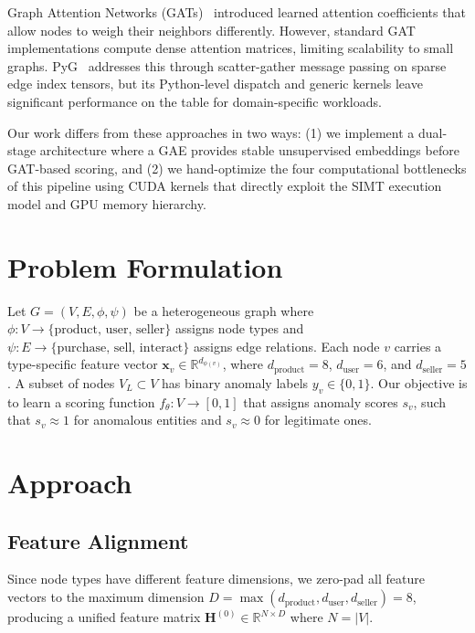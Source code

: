 \documentclass[conference]{IEEEtran}
\begin{document}
Graph Attention Networks (GATs)~\cite{b2} introduced learned attention coefficients that allow nodes to weigh their neighbors differently. However, standard GAT implementations compute dense attention matrices, limiting scalability to small graphs. PyG~\cite{b3} addresses this through scatter-gather message passing on sparse edge index tensors, but its Python-level dispatch and generic kernels leave significant performance on the table for domain-specific workloads.

Our work differs from these approaches in two ways: (1) we implement a dual-stage architecture where a GAE provides stable unsupervised embeddings before GAT-based scoring, and (2) we hand-optimize the four computational bottlenecks of this pipeline using CUDA kernels that directly exploit the SIMT execution model and GPU memory hierarchy.

\section{Problem Formulation}
Let $G = (V, E, \phi, \psi)$ be a heterogeneous graph where $\phi: V \rightarrow \{\text{product, user, seller}\}$ assigns node types and $\psi: E \rightarrow \{\text{purchase, sell, interact}\}$ assigns edge relations. Each node $v$ carries a type-specific feature vector $\mathbf{x}_v \in \mathbb{R}^{d_{\phi(v)}}$, where $d_{\text{product}} = 8$, $d_{\text{user}} = 6$, and $d_{\text{seller}} = 5$. A subset of nodes $V_L \subset V$ has binary anomaly labels $y_v \in \{0, 1\}$. Our objective is to learn a scoring function $f_\theta: V \rightarrow [0, 1]$ that assigns anomaly scores $s_v$, such that $s_v \approx 1$ for anomalous entities and $s_v \approx 0$ for legitimate ones.

\section{Approach}
\subsection{Feature Alignment}
Since node types have different feature dimensions, we zero-pad all feature vectors to the maximum dimension $D = \max(d_{\text{product}}, d_{\text{user}}, d_{\text{seller}}) = 8$, producing a unified feature matrix $\mathbf{H}^{(0)} \in \mathbb{R}^{N \times D}$ where $N = |V|$.
\end{document}
